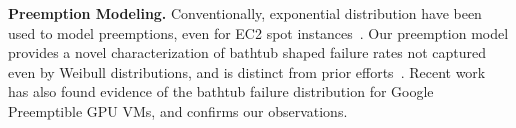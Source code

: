 




\noindent \textbf{Preemption Modeling.}
Conventionally, exponential distribution have been used to model preemptions, even for EC2 spot instances~\cite{bid-cloud, flint, hotcloud-not-bid}. 
Our preemption model provides a novel characterization of bathtub shaped failure rates not captured even by Weibull distributions, and is distinct from prior efforts~\cite{mudholkar1993exponentiated, crevecoeur1993model}. 
%
Recent work~\cite{tian_gpu_icdcs} has also found evidence of the bathtub failure distribution for Google Preemptible GPU VMs, and confirms our observations. 












